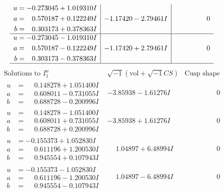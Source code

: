\documentclass[1p]{elsarticle_modified}
\theoremstyle{definition}
\newcommand{\I}{\sqrt{-1}}
\begin{document}
$$\begin{array}{c|c|c}
\begin{aligned}
u &= -0.273045 + 1.019310 I \\
a &= \phantom{-}0.570187 + 0.122249 I \\
b &= \phantom{-}0.303173 + 0.378363 I\end{aligned}
 & -1.17420 - 2.79461 I & \phantom{-0.000000 } 0 \\ \hline\begin{aligned}
u &= -0.273045 - 1.019310 I \\
a &= \phantom{-}0.570187 - 0.122249 I \\
b &= \phantom{-}0.303173 - 0.378363 I\end{aligned}
 & -1.17420 + 2.79461 I & \phantom{-0.000000 } 0\\
 \hline 
 \end{array}$$\newpage$$\begin{array}{c|c|c}  
\text{Solutions to }I^u_{1}& \I (\text{vol} + \sqrt{-1}CS) & \text{Cusp shape}\\
 \hline 
\begin{aligned}
u &= \phantom{-}0.148278 + 1.051400 I \\
a &= \phantom{-}0.608011 - 0.731055 I \\
b &= \phantom{-}0.688728 - 0.200996 I\end{aligned}
 & -3.85938 - 1.61276 I & \phantom{-0.000000 } 0 \\ \hline\begin{aligned}
u &= \phantom{-}0.148278 - 1.051400 I \\
a &= \phantom{-}0.608011 + 0.731055 I \\
b &= \phantom{-}0.688728 + 0.200996 I\end{aligned}
 & -3.85938 + 1.61276 I & \phantom{-0.000000 } 0 \\ \hline\begin{aligned}
u &= -0.155373 + 1.052830 I \\
a &= \phantom{-}0.611196 + 1.200530 I \\
b &= \phantom{-}0.945554 + 0.107943 I\end{aligned}
 & \phantom{-}1.04897 + 6.48994 I & \phantom{-0.000000 } 0 \\ \hline\begin{aligned}
u &= -0.155373 - 1.052830 I \\
a &= \phantom{-}0.611196 - 1.200530 I \\
b &= \phantom{-}0.945554 - 0.107943 I\end{aligned}
 & \phantom{-}1.04897 - 6.48994 I & \phantom{-0.000000 } 0 \\ \hline\begin{aligned}

\end{aligned}
\end{array}$$
\end{document}
